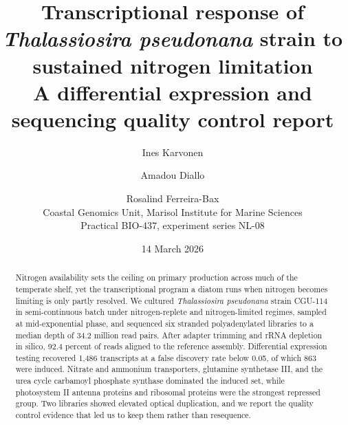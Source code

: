 \documentclass[11pt,a4paper]{article}
\title{\bfseries Transcriptional response of \emph{Thalassiosira pseudonana}
strain \strain{} to sustained nitrogen limitation\\
\large A differential expression and sequencing quality control report}
\author{
  Ines Karvonen \and Amadou Diallo \and Rosalind Ferreira-Bax\\
  \normalsize Coastal Genomics Unit, Marisol Institute for Marine Sciences\\
  \normalsize Practical BIO-437, experiment series NL-08
}
\date{14 March 2026}
\newcommand{\strain}{CGU-114}
\begin{document}
\maketitle

\begin{abstract}
Nitrogen availability sets the ceiling on primary production across much of the
temperate shelf, yet the transcriptional program a diatom runs when nitrogen
becomes limiting is only partly resolved. We cultured
\emph{Thalassiosira pseudonana} strain \strain{} in semi-continuous batch under
nitrogen-replete and nitrogen-limited regimes, sampled at mid-exponential phase,
and sequenced six stranded polyadenylated libraries to a median depth of
34.2 million read pairs. After adapter trimming and rRNA depletion in silico,
92.4 percent of reads aligned to the reference assembly. Differential expression
testing recovered 1{,}486 transcripts at a false discovery rate below 0.05, of
which 863 were induced. Nitrate and ammonium transporters, glutamine synthetase
III, and the urea cycle carbamoyl phosphate synthase dominated the induced set,
while photosystem II antenna proteins and ribosomal proteins were the strongest
repressed group. Two libraries showed elevated optical duplication, and we report
the quality control evidence that led us to keep them rather than resequence.
\end{abstract}








\end{document}
